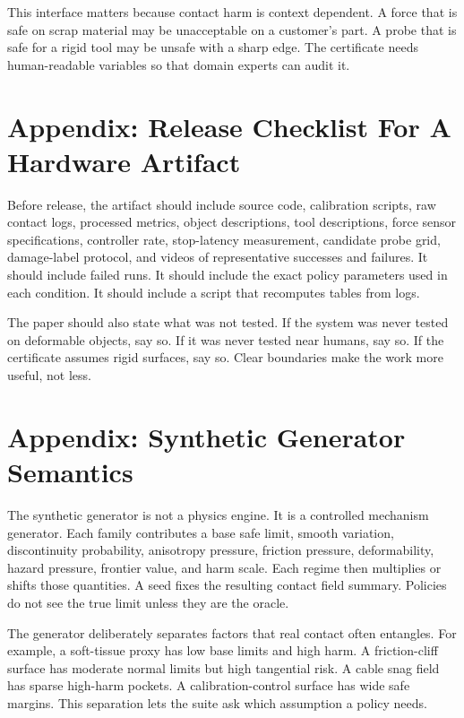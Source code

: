 \documentclass{article}
\begin{document}
This interface matters because contact harm is context dependent. A force that
is safe on scrap material may be unacceptable on a customer's part. A probe
that is safe for a rigid tool may be unsafe with a sharp edge. The certificate
needs human-readable variables so that domain experts can audit it.

\section{Appendix: Release Checklist For A Hardware Artifact}

Before release, the artifact should include source code, calibration scripts,
raw contact logs, processed metrics, object descriptions, tool descriptions,
force sensor specifications, controller rate, stop-latency measurement,
candidate probe grid, damage-label protocol, and videos of representative
successes and failures. It should include failed runs. It should include the
exact policy parameters used in each condition. It should include a script that
recomputes tables from logs.

The paper should also state what was not tested. If the system was never tested
on deformable objects, say so. If it was never tested near humans, say so. If
the certificate assumes rigid surfaces, say so. Clear boundaries make the work
more useful, not less.

\section{Appendix: Synthetic Generator Semantics}

The synthetic generator is not a physics engine. It is a controlled mechanism
generator. Each family contributes a base safe limit, smooth variation,
discontinuity probability, anisotropy pressure, friction pressure,
deformability, hazard pressure, frontier value, and harm scale. Each regime
then multiplies or shifts those quantities. A seed fixes the resulting contact
field summary. Policies do not see the true limit unless they are the oracle.

The generator deliberately separates factors that real contact often entangles.
For example, a soft-tissue proxy has low base limits and high harm. A
friction-cliff surface has moderate normal limits but high tangential risk. A
cable snag field has sparse high-harm pockets. A calibration-control surface
has wide safe margins. This separation lets the suite ask which assumption a
policy needs.
\end{document}
